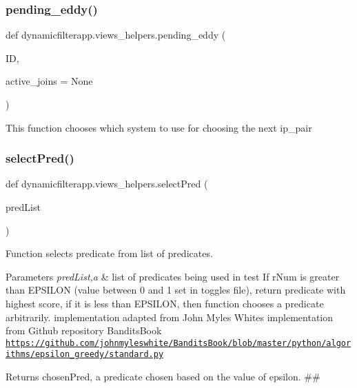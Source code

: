 \subsubsection{\texorpdfstring{pending\+\_\+eddy()}{pending\_eddy()}}
{\footnotesize\ttfamily def dynamicfilterapp.\+views\+\_\+helpers.\+pending\+\_\+eddy (\begin{DoxyParamCaption}\item[{}]{ID,  }\item[{}]{active\+\_\+joins = {\ttfamily None} }\end{DoxyParamCaption})}

\begin{DoxyVerb}This function chooses which system to use for choosing the next ip_pair
\end{DoxyVerb}
 \mbox{\label{namespacedynamicfilterapp_1_1views__helpers_a76037300b9b8c326be6d116519d5a8b9}} 
\subsubsection{\texorpdfstring{select\+Pred()}{selectPred()}}
{\footnotesize\ttfamily def dynamicfilterapp.\+views\+\_\+helpers.\+select\+Pred (\begin{DoxyParamCaption}\item[{}]{pred\+List }\end{DoxyParamCaption})}



Function selects predicate from list of predicates. 


\begin{DoxyParams}{Parameters}
{\em pred\+List,a} & list of predicates being used in test If r\+Num is greater than E\+P\+S\+I\+L\+ON (value between 0 and 1 set in toggles file), return predicate with highest score, if it is less than E\+P\+S\+I\+L\+ON, then function chooses a predicate arbitrarily. implementation adapted from John Myles White\textquotesingle{}s implementation from Github repository Bandits\+Book \href{https://github.com/johnmyleswhite/BanditsBook/blob/master/python/algorithms/epsilon_greedy/standard.py}{\tt https\+://github.\+com/johnmyleswhite/\+Bandits\+Book/blob/master/python/algorithms/epsilon\+\_\+greedy/standard.\+py} \\
\hline
\end{DoxyParams}
\begin{DoxyReturn}{Returns}
chosen\+Pred, a predicate chosen based on the value of epsilon. \#\# 
\end{DoxyReturn}
\mbox{\label{namespacedynamicfilterapp_1_1views__helpers_a57d6ebd6f2f99cba59b82eded490891f}} 
